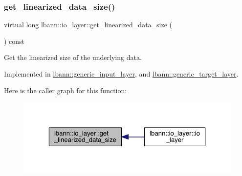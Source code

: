 \mbox{\label{classlbann_1_1io__layer_ab061ec74d131699c7fd59b992bbe7036}} 
\subsubsection{\texorpdfstring{get\+\_\+linearized\+\_\+data\+\_\+size()}{get\_linearized\_data\_size()}}
{\footnotesize\ttfamily virtual long lbann\+::io\+\_\+layer\+::get\+\_\+linearized\+\_\+data\+\_\+size (\begin{DoxyParamCaption}{ }\end{DoxyParamCaption}) const\hspace{0.3cm}{\ttfamily [pure virtual]}}

Get the linearized size of the underlying data. 

Implemented in \hyperlink{classlbann_1_1generic__input__layer_aca46cbf29ad2762e9329b46ab2ad1ae7}{lbann\+::generic\+\_\+input\+\_\+layer}, and \hyperlink{classlbann_1_1generic__target__layer_a26376bcc04f9c8ec35ff99bd71de43d9}{lbann\+::generic\+\_\+target\+\_\+layer}.

Here is the caller graph for this function\+:\nopagebreak
\begin{figure}[H]
\begin{center}
\leavevmode
\includegraphics[width=323pt]{classlbann_1_1io__layer_ab061ec74d131699c7fd59b992bbe7036_icgraph}
\end{center}
\end{figure}
\mbox{\label{classlbann_1_1io__layer_a72a9a1411892b6f03de8b8f9923d77a6}} 

